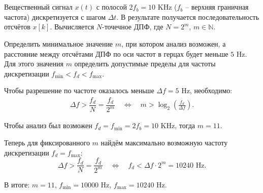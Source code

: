 \section{}
Вещественный сигнал $x(t)$ с полосой $2f_b = 10$ KHz ($f_b$ -- верхняя граничная частота) дискретизуется с шагом $\Delta t$. В результате получается последовательность отсчётов $x[k]$. Вычисляется $N$-точечное ДПФ, где $N = 2^m$, $m \in \mathbb{N}$.

Определить минимальное значение $m$, при котором анализ возможен, а расстояние между отсчётами ДПФ по оси частот в герцах будет меньше $5$ Hz. Для этого значения $m$ определить допустимые пределы для частоты дискретизации $f_{\min} < f_d < f_{\max}$.

Чтобы разрешение по частоте оказалось меньше $\Delta f = 5$ Hz, необходимо:
\begin{align*}
	\Delta f > \dfrac{f_d}{N} = \dfrac{f_d}{2^m}\quad \Leftrightarrow \quad m > \log_2 \left( \frac{f_d}{\Delta f} \right).
\end{align*}

Чтобы анализ был возможен $f_d = f_{\min} = 2f_b = 10$ KHz, тогда $m = 11$.

Теперь для фиксированного $m$ найдём максимально возможную частоту дискретизации $f_d = f_{\max}$:
\begin{equation*}
	\Delta f > \dfrac{f_d}{N} = \dfrac{f_d}{2^m}\quad \Leftrightarrow \quad f_d < \Delta f \cdot 2^m  = 10240\text{ Hz.}
\end{equation*}

В итоге: $m = 11$, $f_{\min} = 10000$ Hz, $f_{\max} = 10240$ Hz.
